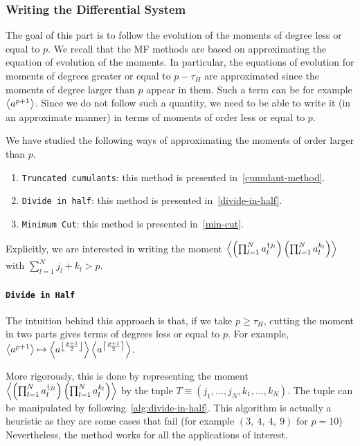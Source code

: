 \subsubsection{Writing the Differential System}

The goal of this part is to follow the evolution of the moments of degree less or equal to $p$. We recall that the MF methods are based on approximating the equation of evolution of the moments. In particular, the equations of evolution for moments of degrees greater or equal to $p - \tau_H$ are approximated since the moments of degree larger than $p$ appear in them. Such a term can be for example $\left\langle a^{p+1} \right\rangle$. Since we do not follow such a quantity, we need to be able to write it (in an approximate manner) in terms of moments of order less or equal to $p$. 

We have studied the following ways of approximating the moments of order larger than $p$.
\begin{enumerate}
    \item \texttt{Truncated cumulants}: this method is presented in~\autoref{cumulant-method}.
    \item \texttt{Divide in half}: this method is presented in~\autoref{divide-in-half}.
    \item \texttt{Minimum Cut}: this method is presented in~\autoref{min-cut}.
\end{enumerate}

Explicitly, we are interested in writing the moment $\left\langle \left(\prod_{l=1}^N a^{\dagger j_l}_l\right) \left(\prod_{l=1}^N a^{k_l}_l\right) \right\rangle$ with $\sum_{l=1}^N j_l + k_l > p$.

\paragraph{\texttt{Divide in Half}} \label{divide-in-half}
The intuition behind this approach is that, if we take $p \ge \tau_H$, cutting the moment in two parts gives terms of degrees less or equal to $p$. For example, $\left\langle a^{p+1} \right\rangle \mapsto \left\langle a^{\left\lfloor \frac{p+1}{2} \right\rfloor} \right\rangle \left\langle a^{\left\lceil \frac{p+1}{2} \right\rceil} \right\rangle$.

More rigorously, this is done by representing the moment $\left\langle \left(\prod_{l=1}^N a^{\dagger j_l}_l\right) \left(\prod_{l=1}^N a^{k_l}_l\right) \right\rangle$ by the tuple $T \equiv (j_1, ..., j_N, k_1, ..., k_N)$. The tuple can be manipulated by following~\autoref{alg:divide-in-half}. This algorithm is actually a heuristic as they are some cases that fail (for example $(3,~4,~4,~9)$ for $p=10$) Nevertheless, the method works for all the applications of interest.

